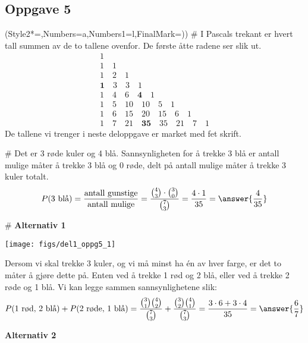 \subsection*{Oppgave 5}
\begin{easylist}[enumerate]
	\ListProperties(Style2*=,Numbers=a,Numbers1=l,FinalMark={)})
	# I Pascals trekant er hvert tall summen av de to tallene ovenfor.
	De første åtte radene ser slik ut.
	\begin{gather*}
	1 \\
	1 \quad 1 \\
	1 \quad 2 \quad 1 \\
	\textbf{1} \quad 3 \quad 3 \quad 1 \\
	1 \quad 4 \quad 6 \quad \textbf{4} \quad 1  \\
	1 \quad 5 \quad 10 \quad 10 \quad 5 \quad 1  \\
	1 \quad 6 \quad 15 \quad 20 \quad 15 \quad 6 \quad 1 \\
	1 \quad 7 \quad 21 \quad \textbf{35} \quad 35 \quad 21 \quad 7 \quad 1 
	\end{gather*}
	De tallene vi trenger i neste deloppgave er market med fet skrift.
	
	# Det er 3 røde kuler og 4 blå. Sannsynligheten for å trekke 3 blå er antall mulige måter å trekke 3 blå og 0 røde, delt på antall mulige måter å trekke 3 kuler totalt.
	\begin{equation*}
		P(3\text{ blå}) = \frac{\text{antall gunstige}}{\text{antall mulige}}
		= \frac{\binom{4}{3} \cdot \binom{3}{0}}{\binom{7}{3}} = 
		\frac{4 \cdot 1}{35} = \answer{\frac{4}{35}}
	\end{equation*}
	
	# \textbf{Alternativ 1}
	\begin{center}
		\texttt{[image: figs/del1\_oppg5\_1]}
	\end{center}
	Dersom vi skal trekke 3 kuler, og vi må minst ha én av hver farge, er det to måter å gjøre dette på. Enten ved å trekke 1 rød og 2 blå, eller ved å trekke 2 røde og 1 blå. Vi kan legge sammen sannsynlighetene slik:
	\begin{equation*}
		P(\text{1 rød, 2 blå}) + P(\text{2 røde, 1 blå}) = \frac{\binom{3}{1}\binom{4}{2}}{\binom{7}{3}}
		+
		\frac{\binom{3}{2}\binom{4}{1}}{\binom{7}{3}} = \frac{3 \cdot 6 + 3 \cdot 4}{35}  = \answer{\frac{6}{7}}
	\end{equation*}
	
	\textbf{Alternativ 2}
	

\end{easylist}
